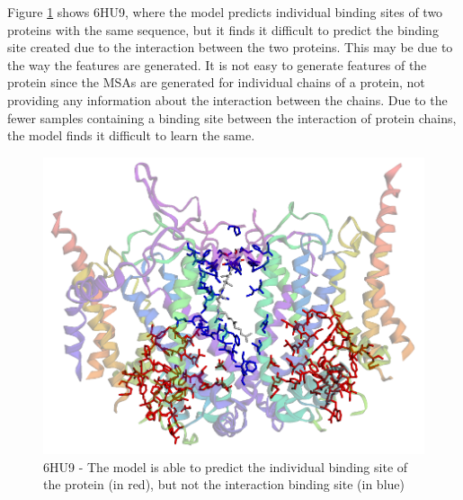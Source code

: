 \documentclass[journal=jcisd8,manuscript=article]{achemso}
\begin{document}
Figure \ref{fig:6hu9} shows 6HU9\cite{maldonado2021atomic}, where the model predicts individual binding sites of two proteins with the same sequence, but it finds it difficult to predict the binding site created due to the interaction between the two proteins. This may be due to the way the features are generated. It is not easy to generate features of the protein since the MSAs are generated for individual chains of a protein, not providing any information about the interaction between the chains. Due to the fewer samples containing a binding site between the interaction of protein chains, the model finds it difficult to learn the same.
\begin{figure}
    \centering
    \noindent\includegraphics[scale=0.35]{6hu9.png}
    \caption{\centering 6HU9 - The model is able to predict the individual binding site of the protein  (in red), but not the interaction binding site (in blue)}
    \label{fig:6hu9}
\end{figure}
\end{document}
